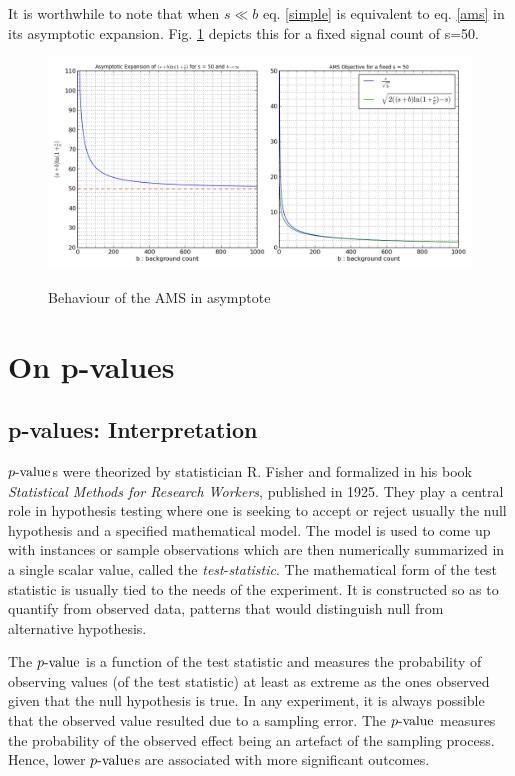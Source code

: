 It is worthwhile to note that when $s \ll b$  eq. \ref{simple} is equivalent to eq. \ref{ams} in its asymptotic expansion. Fig. \ref{ams_theory} depicts this for a fixed signal count of s=50.

\begin{figure}
\centering
\includegraphics[scale=0.6]{images/ams_theory.png}
\label{ams_theory}
\caption{Behaviour of the AMS in asymptote}
\end{figure} 

\section{On p-values}
\label{pvalues}

\subsection{p-values: Interpretation}

$\mathop{p{\textnormal{-value}}}$s were theorized by statistician R. Fisher and formalized in his book \textit{Statistical Methods for Research Workers}, published in 1925. They play a central role in hypothesis testing where one is seeking to accept or reject usually the null hypothesis and a specified mathematical model. The model is used to come up with instances or sample observations which are then numerically summarized in a single scalar value, called the \textit{test}-\textit{statistic}. The mathematical form of the test statistic is usually tied to the needs of the experiment. It is constructed so as to quantify from observed data, patterns that would distinguish null from alternative hypothesis. 

The $\mathop{p{\textnormal{-value}}}$ is a function of the test statistic and measures the probability of observing values (of the test statistic) at least as extreme as the ones observed given that the null hypothesis is true. In any experiment, it is always possible that the observed value resulted due to a sampling error. The $\mathop{p{\textnormal{-value}}}$ measures the probability of the observed effect being an artefact of the sampling process. Hence, lower $\mathop{p{\textnormal{-value}}}$s are associated with more significant outcomes. 


